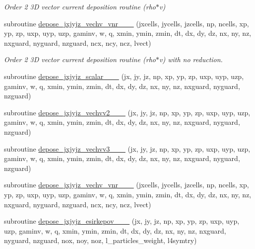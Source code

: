 \begin{DoxyCompactItemize}
\begin{DoxyCompactList}\small\item\em Order 2 3D vector current deposition routine (rho$\ast$v) \end{DoxyCompactList}\item 
subroutine \hyperlink{current__deposition_8_f90_a110bf577b181354401374e000770acbf}{depose\+\_\+jxjyjz\+\_\+vechv\+\_\+vnr\+\_\+\_\+\_} (jxcells, jycells, jzcells, np, ncells, xp, yp, zp,                                   uxp, uyp, uzp, gaminv, w, q, xmin, ymin, zmin,                                       dt, dx, dy, dz, nx, ny, nz, nxguard, nyguard, nzguard, ncx, ncy, ncz, lvect)
\begin{DoxyCompactList}\small\item\em Order 2 3D vector current deposition routine (rho$\ast$v) with no reduction. \end{DoxyCompactList}\item 
subroutine \hyperlink{current__deposition_8_f90_a9b0dd01b38cde503f1aac44bb2bd1ca8}{depose\+\_\+jxjyjz\+\_\+scalar\+\_\+\_\+\_} (jx, jy, jz, np, xp, yp, zp, uxp, uyp, uzp, gaminv, w, q, xmin, ymin, zmin,                                       dt, dx, dy, dz, nx, ny, nz, nxguard, nyguard, nzguard)
\item 
subroutine \hyperlink{current__deposition_8_f90_a36572b29ee3f03dd598f10e2268204f0}{depose\+\_\+jxjyjz\+\_\+vechvv2\+\_\+\_\+\_} (jx, jy, jz, np, xp, yp, zp, uxp, uyp, uzp, gaminv, w, q, xmin, ymin, zmin,                                       dt, dx, dy, dz, nx, ny, nz, nxguard, nyguard, nzguard)
\item 
subroutine \hyperlink{current__deposition_8_f90_a4b4bb06ef5eb6ca6e28d2c24472fb216}{depose\+\_\+jxjyjz\+\_\+vechvv3\+\_\+\_\+\_} (jx, jy, jz, np, xp, yp, zp, uxp, uyp, uzp, gaminv, w, q, xmin, ymin, zmin,                                       dt, dx, dy, dz, nx, ny, nz, nxguard, nyguard, nzguard)
\item 
subroutine \hyperlink{current__deposition_8_f90_a95bde392441e1836c282cd5b53c6e5c1}{depose\+\_\+jxjyjz\+\_\+vechv\+\_\+vnr\+\_\+\_\+\_} (jxcells, jycells, jzcells, np, ncells, xp, yp, zp,                                   uxp, uyp, uzp, gaminv, w, q, xmin, ymin, zmin,                                       dt, dx, dy, dz, nx, ny, nz, nxguard, nyguard, nzguard, ncx, ncy, ncz, lvect)
\item 
subroutine \hyperlink{current__deposition_8_f90_ad43ded0ebf597e9d3cb47ff84ec04413}{depose\+\_\+jxjyjz\+\_\+esirkepov\+\_\+\_\+\_} (jx, jy, jz, np, xp, yp, zp, uxp, uyp, uzp, gaminv, w, q, xmin, ymin, zmin,                                                                                                                                                   dt, dx, dy, dz, nx, ny, nz, nxguard, nyguard, nzguard,                                                                                                                                                   nox, noy, noz, l\+\_\+particles\+\_\+weight, l4symtry)

\end{DoxyCompactItemize}
